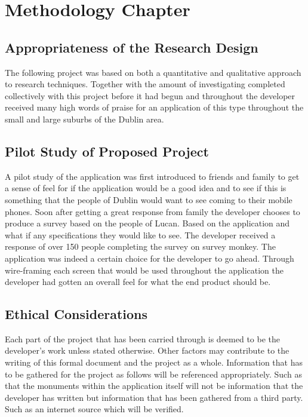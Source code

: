 \chapter{Methodology Chapter}

\section{Appropriateness of the Research Design}
The following project was based on both a quantitative and qualitative approach to research techniques. Together with the amount of investigating completed collectively with this project before it had begun and throughout the developer received many high words of praise for an application of this type throughout the small and large suburbs of the Dublin area.

\section{Pilot Study of Proposed Project}
A pilot study of the application was first introduced to friends and family to get a sense of feel for if the application would be a good idea and to see if this is something that the people of Dublin would want to see coming to their mobile phones. Soon after getting a great response from family the developer chooses to produce a survey based on the people of Lucan. Based on the application and what if any specifications they would like to see. The developer received a response of over 150 people completing the survey on survey monkey. The application was indeed a certain choice for the developer to go ahead. Through wire-framing each screen that would be used throughout the application the developer had gotten an overall feel for what the end product should be.

\section{Ethical Considerations}
Each part of the project that has been carried through is deemed to be the developer's work unless stated otherwise. Other factors may contribute to the writing of this formal document and the project as a whole. Information that has to be gathered for the project as follows will be referenced appropriately. Such as that the monuments within the application itself will not be information that the developer has written but information that has been gathered from a third party. Such as an internet source which will be verified.

